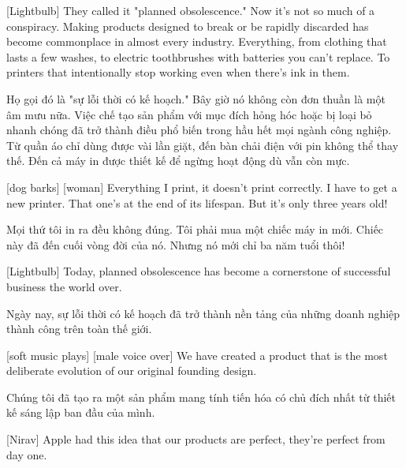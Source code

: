 \documentclass[a4paper]{article}
\begin{document}
	[Lightbulb] They called it "planned obsolescence."
	Now it's not so much of a conspiracy.
	Making products designed to break or be rapidly discarded has become commonplace in almost every industry.
	Everything, from clothing that lasts a few washes, to electric toothbrushes with batteries you can't replace.
	To printers that intentionally stop working even when there's ink in them.
	
	\begin{vietnamese-v2}
		 Họ gọi đó là "sự lỗi thời có kế hoạch." Bây giờ nó không còn đơn thuần là một âm mưu nữa. Việc chế tạo sản phẩm với mục đích hỏng hóc hoặc bị loại bỏ nhanh chóng đã trở thành điều phổ biến trong hầu hết mọi ngành công nghiệp. Từ quần áo chỉ dùng được vài lần giặt, đến bàn chải điện với pin không thể thay thế. Đến cả máy in được thiết kế để ngừng hoạt động dù vẫn còn mực.
	\end{vietnamese-v2}
	
	[dog barks]
	[woman] Everything I print, it doesn't print correctly.
	I have to get a new printer. That one's at the end of its lifespan.
	But it's only three years old!
	
	\begin{vietnamese-v2}
		 Mọi thứ tôi in ra đều không đúng. 
		Tôi phải mua một chiếc máy in mới. Chiếc này đã đến cuối vòng đời của nó. 
		Nhưng nó mới chỉ ba năm tuổi thôi!
	\end{vietnamese-v2}
	
	[Lightbulb] Today, planned obsolescence has become a cornerstone of successful business the world over.
	
	\begin{vietnamese-v2}
		 Ngày nay, sự lỗi thời có kế hoạch đã trở thành nền tảng của những doanh nghiệp thành công trên toàn thế giới.
	\end{vietnamese-v2}
	
	[soft music plays]
	[male voice over] We have created a product that is the most deliberate evolution of our original founding design.
	
	\begin{vietnamese-v2}
		 Chúng tôi đã tạo ra một sản phẩm mang tính tiến hóa có chủ đích nhất từ thiết kế sáng lập ban đầu của mình.
	\end{vietnamese-v2}
	
	[Nirav] Apple had this idea that our products are perfect, they're perfect from day one.
	
\end{document}
